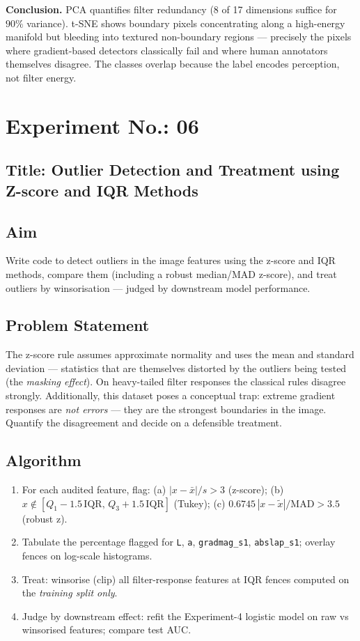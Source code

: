 \documentclass[11pt,a4paper]{article}
\newcommand{\labsection}[1]{\subsection*{#1}}
\begin{document}
\textbf{Conclusion.} PCA quantifies filter redundancy (8 of 17 dimensions suffice for $90\%$ variance). t-SNE shows boundary pixels concentrating along a high-energy manifold but bleeding into textured non-boundary regions --- precisely the pixels where gradient-based detectors classically fail and where human annotators themselves disagree. The classes overlap because the label encodes perception, not filter energy.

\newpage
\section*{Experiment No.: 06}
\labsection{Title: Outlier Detection and Treatment using Z-score and IQR Methods}

\labsection{Aim}
Write code to detect outliers in the image features using the z-score and IQR methods, compare them (including a robust median/MAD z-score), and treat outliers by winsorisation --- judged by downstream model performance.

\labsection{Problem Statement}
The z-score rule assumes approximate normality and uses the mean and standard deviation --- statistics that are themselves distorted by the outliers being tested (the \emph{masking effect}). On heavy-tailed filter responses the classical rules disagree strongly. Additionally, this dataset poses a conceptual trap: extreme gradient responses are \emph{not errors} --- they are the strongest boundaries in the image. Quantify the disagreement and decide on a defensible treatment.

\labsection{Algorithm}
\begin{enumerate}[nosep]
  \item For each audited feature, flag: (a) $|x-\bar x|/s > 3$ (z-score); (b) $x \notin [Q_1-1.5\,\mathrm{IQR},\,Q_3+1.5\,\mathrm{IQR}]$ (Tukey); (c) $0.6745\,|x-\tilde x|/\mathrm{MAD} > 3.5$ (robust z).
  \item Tabulate the percentage flagged for \texttt{L}, \texttt{a}, \texttt{gradmag\_s1}, \texttt{abslap\_s1}; overlay fences on log-scale histograms.
  \item Treat: winsorise (clip) all filter-response features at IQR fences computed on the \emph{training split only}.
  \item Judge by downstream effect: refit the Experiment-4 logistic model on raw vs winsorised features; compare test AUC.
\end{enumerate}
\end{document}

